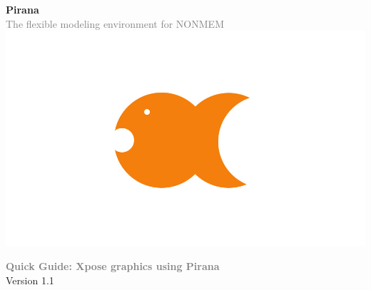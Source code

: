 \documentclass[a4,10pt]{article} \usepackage[pdftex]{graphicx}
\renewcommand{\emph}[1]{\textbf{\textcolor{Grey}{#1}}}
\begin{document}
{\centering
  \vspace{-100pt}
  \textbf{
    \textcolor{PiranaOrange}{\Large Pirana}
  }\\
  \vspace{5pt} \scriptsize \textcolor{Grey}{The flexible modeling
    environment for NONMEM} \\ \normalsize
  \vspace{12pt}
  \hspace{5pt}\includegraphics[scale=0.14]{images/pirana_logo.jpg}\\
  \vspace{18pt}

  {\large
    \emph{Quick Guide: Xpose graphics using Pirana}  \vspace{10pt} \\
        Version 1.1
  }

}
\vspace{25pt}


\end{document}
